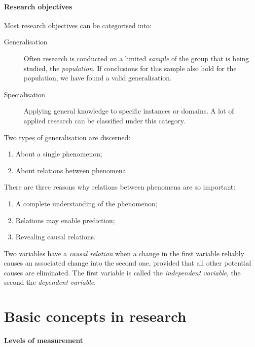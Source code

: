 \paragraph{Research objectives}

Most research objectives can be categorised into:

\begin{description}
	\item[Generalisation] Often research is conducted on a limited \emph{sample} of the group that is being studied, the \emph{population}. If conclusions for this sample also hold for the population, we have found a valid generalisation.
    \item[Specialisation] Applying general knowledge to specific instances or domains. A lot of applied research can be classified under this category.
\end{description}

Two types of generalisation are discerned:

\begin{enumerate}
	\item About a single phenomenon;
	\item About relations between phenomena.
\end{enumerate}

There are three reasons why relations between phenomena are so important:

\begin{enumerate}
	\item A complete understanding of the phenomenon;
	\item Relations may enable prediction;
	\item Revealing causal relations.
\end{enumerate}

\begin{definition}
    Two variables have a \emph{causal relation} when a change in the first variable reliably causes an associated change into the second one, provided that all other potential causes are eliminated. The first variable is called the \emph{independent variable}, the second the \emph{dependent variable}.
\end{definition}

\section{Basic concepts in research}

\paragraph{Levels of measurement}

